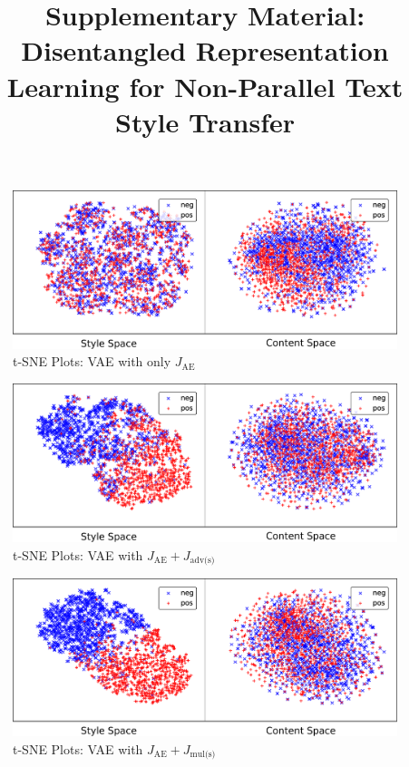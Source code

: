 \documentclass[letterpaper]{article}
\title{Supplementary Material:\\Disentangled Representation Learning for Non-Parallel Text Style Transfer}
\date{}
\author{}
\begin{document}
\maketitle
\graphicspath{{images/}}

\newcommand{\loss}[1]{J_{\text{#1}}}


\begin{figure}[ht!]
	\includegraphics[width=\linewidth]{vae-latent-spaces-only-rec}
	\caption{t-SNE Plots: VAE with only $\loss{AE}$}
	\label{fig:vae-tsne-only-rec}
\end{figure}

\begin{figure}[ht!]
	\includegraphics[width=\linewidth]{vae-latent-spaces-rec-adv}
	\caption{t-SNE Plots: VAE with $\loss{AE} + \loss{adv(s)}$}
	\label{fig:vae-tsne-rec-adv}
\end{figure}

\begin{figure}[ht!]
	\includegraphics[width=\linewidth]{vae-latent-spaces-rec-mult}
	\caption{t-SNE Plots: VAE with $\loss{AE} + \loss{mul(s)}$}
	\label{fig:vae-tsne-rec-mult}
\end{figure}
\end{document}

